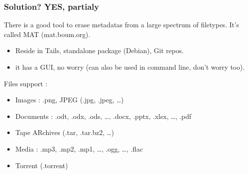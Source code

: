 \begin{frame}
\frametitle{Solution? YES, partialy}
There is a good tool to erase metadatas from a large spectrum of filetypes.
It's called MAT (mat.boum.org).
\begin{itemize}
\item Reside in Tails, standalone package (Debian), Git repos.
\item it has a GUI, no worry (can also be used in command line, don't
 worry too).
\end{itemize}
Files support :
\begin{itemize}
\item Images : .png, JPEG (.jpg, .jpeg, …)
\item Documents : .odt, .odx, .ods, …, .docx, .pptx, .xlsx, …, .pdf
\item Tape ARchives (.tar, .tar.bz2, …)
\item Media : .mp3, .mp2, .mp1, …, .ogg, …, .flac
\item Torrent (.torrent)
\end{itemize}
\end{frame}
